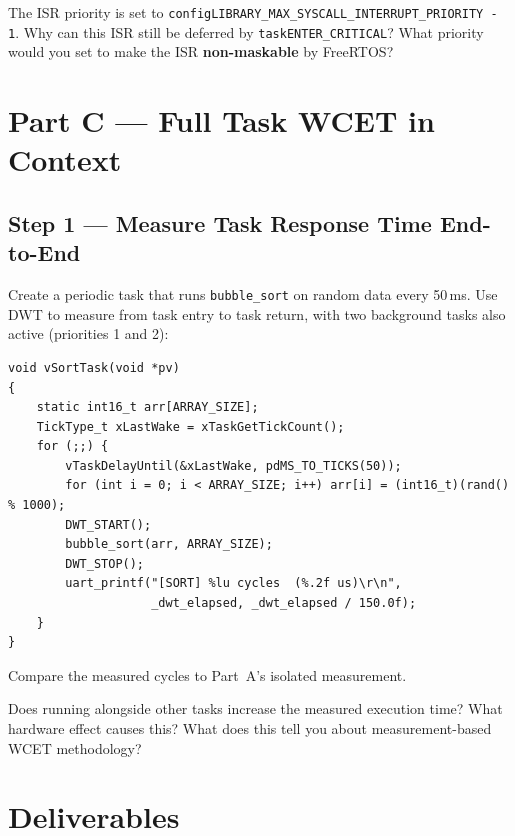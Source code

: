 \documentclass[11pt, a4paper]{article}
\begin{document}
\begin{questionbox}[~B3]
  The ISR priority is set to
  \texttt{configLIBRARY\_MAX\_SYSCALL\_INTERRUPT\_PRIORITY - 1}. Why can this ISR still
  be deferred by \texttt{taskENTER\_CRITICAL}? What priority would you set to make the
  ISR \textbf{non-maskable} by FreeRTOS?
\end{questionbox}

\section{Part C --- Full Task WCET in Context}

\subsection{Step 1 --- Measure Task Response Time End-to-End}

Create a periodic task that runs \texttt{bubble\_sort} on random data every 50\,ms.
Use DWT to measure from task entry to task return, with two background tasks also active
(priorities 1 and 2):

\begin{lstlisting}[style=cstyle]
void vSortTask(void *pv)
{
    static int16_t arr[ARRAY_SIZE];
    TickType_t xLastWake = xTaskGetTickCount();
    for (;;) {
        vTaskDelayUntil(&xLastWake, pdMS_TO_TICKS(50));
        for (int i = 0; i < ARRAY_SIZE; i++) arr[i] = (int16_t)(rand() % 1000);
        DWT_START();
        bubble_sort(arr, ARRAY_SIZE);
        DWT_STOP();
        uart_printf("[SORT] %lu cycles  (%.2f us)\r\n",
                    _dwt_elapsed, _dwt_elapsed / 150.0f);
    }
}
\end{lstlisting}

Compare the measured cycles to Part~A's isolated measurement.

\begin{questionbox}[~C1]
  Does running alongside other tasks increase the measured execution time? What hardware
  effect causes this? What does this tell you about measurement-based WCET methodology?
\end{questionbox}

\section{Deliverables}
\end{document}
